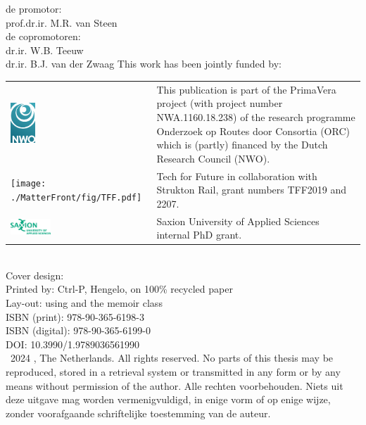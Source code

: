 \begin{titlingpage}
de promotor:\\[0.5\baselineskip]
prof.dr.ir. M.R. van Steen \\[1.5\baselineskip]

de copromotoren:\\[0.5\baselineskip]
dr.ir. W.B. Teeuw\\
dr.ir. B.J. van der Zwaag
\vfill
This work has been jointly funded by:\\[1.5\baselineskip]
\begin{tabular}{@{}m{2cm}m{9.7cm}}
	\includegraphics[height=1.5cm]{./MatterFront/fig/NWOlogo.eps} &%
	This publication is part of the PrimaVera project (with project number NWA.1160.18.238) of the research programme Onderzoek op Routes door Consortia (ORC) which is (partly) financed by the Dutch Research Council (NWO).\\[2\normalbaselineskip]
	\texttt{[image: ./MatterFront/fig/TFF.pdf]} &%
	Tech for Future in collaboration with Strukton Rail, grant numbers TFF2019 and 2207.\\[2\normalbaselineskip]
	\includegraphics[width=1.5cm]{./MatterFront/fig/Logo_Saxion_UAS_CMYK.eps} &%
	Saxion University of Applied Sciences internal PhD grant.
\end{tabular}
\\[2\baselineskip]

Cover design: \theauthor\\
Printed by: Ctrl-P, Hengelo, on 100\% recycled paper\\
Lay-out: \theauthor{} using \LaTeXe{} and the \textsf{memoir} class\\
ISBN (print): 978-90-365-6198-3\\
ISBN (digital): 978-90-365-6199-0 \\
DOI: 10.3990/1.9789036561990\\[2\baselineskip]
   
\textcopyright\ 2024 \theauthor, The Netherlands. 
All rights reserved. 
No parts of this thesis may be reproduced, stored in a retrieval system or transmitted in any form or by any means without permission of the author. 
Alle rechten voorbehouden. 
Niets uit deze uitgave mag worden vermenigvuldigd, in enige vorm of op enige wijze, zonder voorafgaande schriftelijke toestemming van de auteur.
\end{titlingpage}

